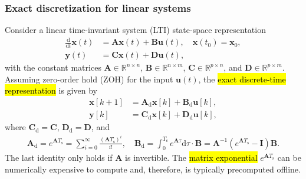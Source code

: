 \begin{frame}
    \frametitle{Exact discretization for linear systems}
    Consider a linear time-invariant system (LTI) state-space representation
    \begin{equation}
        \begin{split}
            \frac{\mathrm{d}}{\mathrm{d}t}\bm{x}(t) & = \bm{A}\bm{x}(t) + \bm{B}\bm{u}(t), \quad \bm{x}(t_0)=\bm{x}_0, \\
            \bm{y}(t)                               & = \bm{C}\bm{x}(t) + \bm{D}\bm{u}(t),
        \end{split}
        \label{eq:LTI_state_space}
    \end{equation}
    with the constant matrices $\bm{A}\in \mathbb{R}^{n\times n}$, $\bm{B}\in \mathbb{R}^{n\times m}$, $\bm{C}\in \mathbb{R}^{p\times n}$, and $\bm{D}\in \mathbb{R}^{p\times m}$. \pause Assuming zero-order hold (ZOH) for the input $\bm{u}(t)$, the \hl{exact discrete-time representation} is given by
    \begin{equation}
        \begin{split}
            \bm{x}[k+1] & = \bm{A}_\mathrm{d}\bm{x}[k] + \bm{B}_\mathrm{d}\bm{u}[k], \\
            \bm{y}[k]   & = \bm{C}_\mathrm{d}\bm{x}[k] + \bm{D}_\mathrm{d}\bm{u}[k],
        \end{split}
        \label{eq:exact_discretization}
    \end{equation}\pause
    where $\bm{C}_\mathrm{d}  = \bm{C}$, $\bm{D}_\mathrm{d}  = \bm{D}$, and
    \begin{equation}
        \begin{split}
            \bm{A}_\mathrm{d}  = e^{\bm{A}T_\mathrm{s}}=\sum_{i=0}^{\infty} \frac{(\bm{A}T_\mathrm{s})^i}{i!}, \quad
            \bm{B}_\mathrm{d}  = \int_{0}^{T_\mathrm{s}} e^{\bm{A}\tau}\mathrm{d}\tau \cdot \bm{B}=\bm{A}^{-1}(e^{\bm{A}T_\mathrm{s}}-\bm{I})\bm{B}.
        \end{split}
        \label{eq:exact_discretization_matrices}
    \end{equation}\pause
    The last identity only holds if $\bm{A}$ is invertible. The \hl{matrix exponential} $e^{\bm{A}T_\mathrm{s}}$ can be numerically expensive to compute and, therefore, is typically precomputed offline.
\end{frame}

